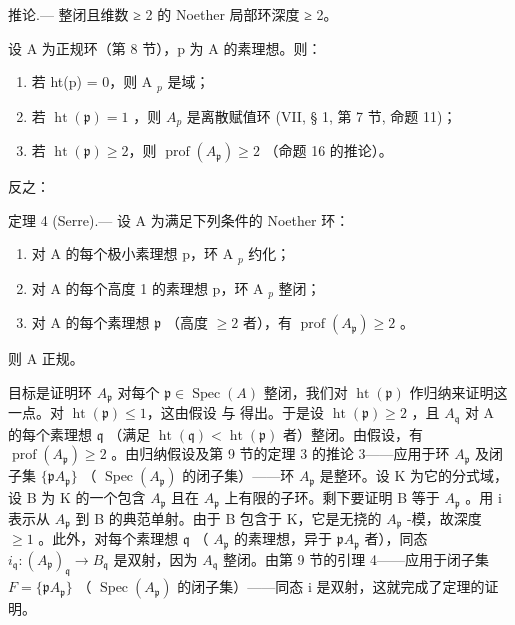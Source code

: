 推论.--- 整闭且维数 ≥ 2 的 Noether 局部环深度 ≥ 2。

设 A 为正规环（第 8 节），p 为 A 的素理想。则：

\begin{enumerate}
\def\labelenumi{\alph{enumi})}
\item
  若 ht(p) = 0，则 A \(_{p}\) 是域；
\item
  若 \(\operatorname{ht}(\mathfrak{p}) = 1\) ，则 \(A_{p}\) 是离散赋值环 (VII, § 1, 第 7 节, 命题 11)；
\item
  若 \(\operatorname{ht}(\mathfrak{p}) \geqslant 2\)，则 \(\operatorname{prof}(A_{\mathfrak{p}}) \geqslant 2\) （命题 16 的推论）。
\end{enumerate}

反之：

定理 4 (Serre).--- 设 A 为满足下列条件的 Noether 环：

\begin{enumerate}
\def\labelenumi{(\roman{enumi})}
\item
  对 A 的每个极小素理想 p，环 A \(_{p}\) 约化；
\item
  对 A 的每个高度 1 的素理想 p，环 A \(_{p}\) 整闭；
\item
  对 A 的每个素理想 \(\mathfrak{p}\) （高度 \(\geqslant 2\) 者），有 \(\operatorname{prof}(A_{\mathfrak{p}}) \geqslant 2\) 。
\end{enumerate}

则 A 正规。

目标是证明环 \(A_{\mathfrak{p}}\) 对每个 \(\mathfrak{p} \in \operatorname{Spec}(A)\) 整闭，我们对 \(\operatorname{ht}(\mathfrak{p})\) 作归纳来证明这一点。对 \(\operatorname{ht}(\mathfrak{p}) \leqslant 1\)，这由假设 与 得出。于是设 \(\operatorname{ht}(\mathfrak{p}) \geqslant 2\) ，且 \(A_{\mathfrak{q}}\) 对 A 的每个素理想 \(\mathfrak{q}\) （满足 \(\operatorname{ht}(\mathfrak{q}) < \operatorname{ht}(\mathfrak{p})\) 者）整闭。由假设，有 \(\operatorname{prof}(A_{\mathfrak{p}}) \geqslant 2\) 。由归纳假设及第 9 节的定理 3 的推论 3——应用于环 \(A_{\mathfrak{p}}\) 及闭子集 \(\{\mathfrak{p}A_{\mathfrak{p}}\}\) （ \(\operatorname{Spec}(A_{\mathfrak{p}})\) 的闭子集）——环 \(A_{\mathfrak{p}}\) 是整环。设 K 为它的分式域，设 B 为 K 的一个包含 \(A_{\mathfrak{p}}\) 且在 \(A_{\mathfrak{p}}\) 上有限的子环。剩下要证明 B 等于 \(A_{\mathfrak{p}}\) 。用 i 表示从 \(A_{\mathfrak{p}}\) 到 B 的典范单射。由于 B 包含于 K，它是无挠的 \(A_{\mathfrak{p}}\) -模，故深度 \(\geqslant 1\) 。此外，对每个素理想 \(\mathfrak{q}\) （ \(A_{\mathfrak{p}}\) 的素理想，异于 \(\mathfrak{p}A_{\mathfrak{p}}\) 者），同态 \(i_{\mathfrak{q}}: (A_{\mathfrak{p}})_{\mathfrak{q}} \to B_{\mathfrak{q}}\) 是双射，因为 \(A_{\mathfrak{q}}\) 整闭。由第 9 节的引理 4——应用于闭子集 \(F = \{\mathfrak{p}A_{\mathfrak{p}}\}\) （ \(\operatorname{Spec}(A_{\mathfrak{p}})\) 的闭子集）——同态 i 是双射，这就完成了定理的证明。

